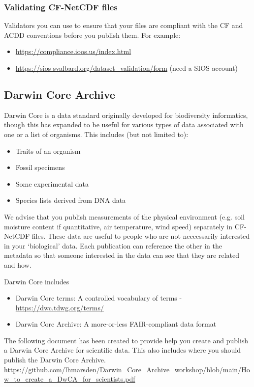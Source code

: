 \documentclass[a4paper,12pt]{article}
\begin{document}
\subsubsection{Validating CF-NetCDF files}
Validators you can use to ensure that your files are compliant with the CF and ACDD conventions before you publish them. For example:
\begin{itemize}
    \item \url{https://compliance.ioos.us/index.html}
    \item \url{https://sios-svalbard.org/dataset_validation/form} (need a SIOS account)
\end{itemize}

\subsection{Darwin Core Archive}

Darwin Core is a data standard originally developed for biodiversity informatics, though this has expanded to be useful for various types of data associated with one or a list of organisms. This includes (but not limited to):
\begin{itemize}
\item{Traits of an organism}
\item{Fossil specimens}
\item{Some experimental data}
\item{Species lists derived from DNA data}
\end{itemize}

We advise that you publish measurements of the physical environment (e.g. soil moisture content if quantitative, air temperature, wind speed) separately in CF-NetCDF files. These data are useful to people who are not neccessarily interested in your `biological' data. Each publication can reference the other in the metadata so that someone interested in the data can see that they are related and how.

Darwin Core includes
\begin{itemize}
\item Darwin Core terms: A controlled vocabulary of terms - \url{https://dwc.tdwg.org/terms/}
\item Darwin Core Archive: A more-or-less FAIR-compliant data format
\end{itemize} 

The following document has been created to provide help you create and publish a Darwin Core Archive for scientific data. This also includes where you should publish the Darwin Core Archive.
\url{https://github.com/lhmarsden/Darwin_Core_Archive_workshop/blob/main/How_to_create_a_DwCA_for_scientists.pdf}
\end{document}
